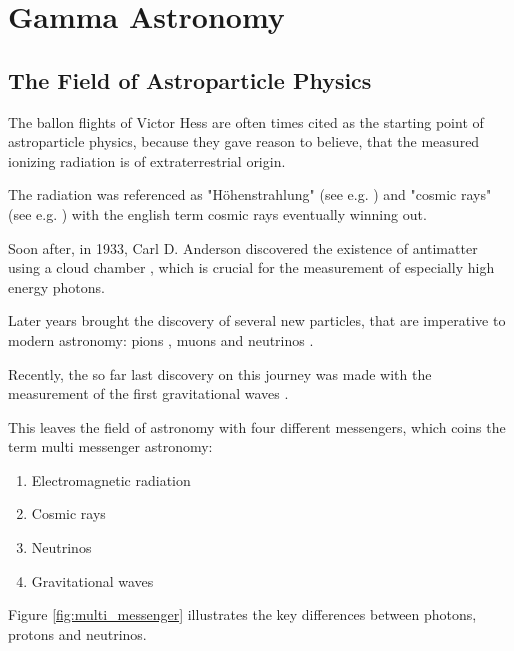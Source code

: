 \chapter{Gamma Astronomy}

\section{The Field of Astroparticle Physics}

The ballon flights of Victor Hess \cite{Hess:1912srp} are
often times cited as the starting point of astroparticle physics,
because they gave reason to believe, that the measured ionizing
radiation is of extraterrestrial origin. 

The radiation was referenced as "Höhenstrahlung" 
(see e.g. \cite{myssowsky1926versuche}) 
and "cosmic rays" (see e.g. \cite{millikan1928origin}) with 
the english term cosmic rays eventually winning out.

Soon after, in 1933, Carl D. Anderson discovered the existence
of antimatter using a cloud chamber \cite{PhysRev.43.491},
which is crucial for the measurement of especially
high energy photons.

Later years brought the discovery of several new particles,
that are imperative to modern astronomy:
pions \cite{LATTES1947}, muons \cite{PhysRev.52.1003}
and neutrinos \cite{Cowan103}.

Recently, the so far last discovery on this journey
was made with the measurement of the first gravitational 
waves \cite{PhysRevLett.118.221101}.

This leaves the field of astronomy with four different
messengers, which coins the term
multi messenger astronomy:
\begin{enumerate}
	\item Electromagnetic radiation
	\item Cosmic rays
	\item Neutrinos
	\item Gravitational waves
\end{enumerate}

Figure \ref{fig:multi_messenger} illustrates the key differences between
photons, protons and neutrinos.

